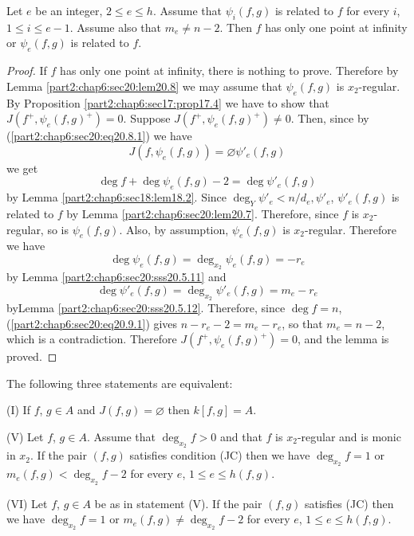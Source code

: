 \begin{lemma}\label{part2:chap6:sec20:lem20.9}
  Let $e$ be an integer, $2 \leq e \leq h$. Assume that $\psi_i (f,
  g)$ is related to $f$ for every $i$, $1 \leq i \leq e-1$. Assume
  also that $m_e \neq n-2$. Then $f$ has only one point at infinity or
  $\psi_e (f, g)$ is related to $f$.
\end{lemma}

\begin{proof}
  If $f$ has only one point at infinity, there is nothing to
  prove. Therefore by Lemma \ref{part2:chap6:sec20:lem20.8} we may
  assume that $\psi_e (f, g)$ is $x_2$-regular. By Proposition
  \ref{part2:chap6:sec17:prop17.4} we have to show that $J(f^+, \psi_e
  (f, g)^+)=0$. Suppose $J(f^+, \psi_e (f, g)^+)\neq 0$. Then, since
  by  (\ref{part2:chap6:sec20:eq20.8.1}) we have
$$
  J(f, \psi_e (f, g))= \diameter \psi'_e (f, g)
$$
we get 
\begin{equation*}
  \deg f+ \deg \psi_e (f, g) - 2 = \deg \psi'_e (f, g)
  \tag{20.9.1}\label{part2:chap6:sec20:eq20.9.1} 
\end{equation*}
by Lemma \ref{part2:chap6:sec18:lem18.2}. Since $\deg_Y \psi'_e <
n/d_e, \psi'_e$, $\psi'_e (f, g)$ is related to $f$ by Lemma
\ref{part2:chap6:sec20:lem20.7}. Therefore, since $f$ is
$x_2$-regular, so is $\psi_e (f, g)$. Also, by assumption, $\psi_e (f,
g)$ is $x_2$-regular. Therefore we have
$$
\deg \psi_e (f, g) = \deg_{x_2} \psi_e (f, g) =- r_e
$$ 
by Lemma \ref{part2:chap6:sec20:sss20.5.11} and 
$$
\deg \psi'_e (f, g) = \deg_{x_2} \psi'_e (f, g) = m_e - r_e
$$
by\pageoriginale Lemma \ref{part2:chap6:sec20:sss20.5.12}. Therefore, since $\deg f=
n$, (\ref{part2:chap6:sec20:eq20.9.1}) gives $n- r_e -2= m_e - r_e$,
so that $m_e = n-2$, which is a contradiction. Therefore $J(f^+,
\psi_e (f, g)^+ )=0$, and the lemma is proved. 
\end{proof}

\begin{thm}\label{part2:chap6:sec20:thm20.10}  
  The following three statements are equivalent:

  {\rm (I)} If $f$, $g \in A$ and $J(f, g)=\diameter$ then $k[f, g]=A$.

  {\rm (V)} Let $f$, $g \in A$. Assume that $\deg_{x_2} f > 0$ and that $f$
  is $x_2$-regular and is monic in $x_2$. If the pair $(f, g)$
  satisfies condition (JC) then we have $\deg_{x_2} f=1$ or $m_e (f,
  g) < \deg_{x_2} f-2$ for every $e$, $1 \leq e \leq h(f, g)$.

  {\rm (VI)} Let $f$, $g \in A$ be as in statement (V). If the pair $(f, g)$
  satisfies (JC) then we have $\deg_{x_2} f=1$ or $m_e(f, g) \neq
  \deg_{x_2} f-2$ for every $e$, $1 \leq e \leq h(f, g)$.
\end{thm}

